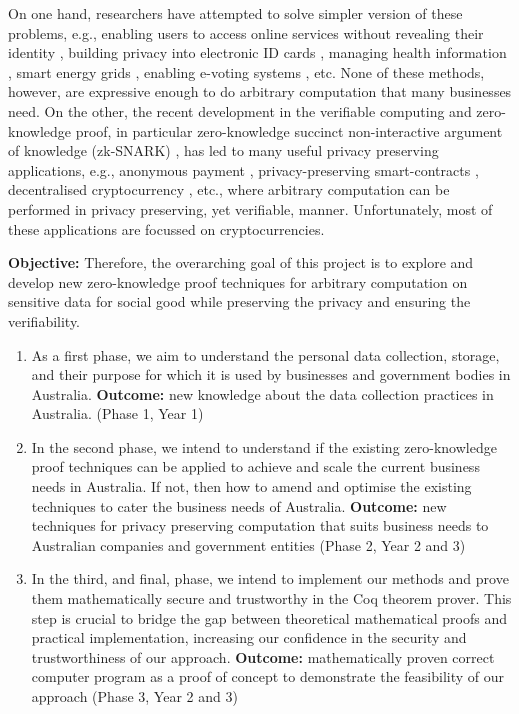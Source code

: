 \documentclass[12pt,a4paper]{article}
\begin{document}
On one hand, researchers have attempted to solve simpler version of 
these problems, e.g., 
enabling users to access online 
services without revealing their identity \cite{10.1145/586110.586114},
building privacy into electronic ID cards \cite{10.1145/2133375.2133379},
managing health information \cite{10.1145/3338854},
smart energy grids  \cite{LIN2021103505}, enabling e-voting systems \cite{doesburg2020using}, etc. 
None of these methods, however, are expressive enough to do arbitrary
computation that many businesses need. On the other, 
the recent development in the verifiable computing and zero-knowledge proof, 
in particular zero-knowledge succinct non-interactive argument of knowledge (zk-SNARK) 
\cite{10.1007/978-3-642-17373-8_19, 10.1007/978-3-642-38348-9_37, 
ben2013snarks, parno2016pinocchio, groth2016size, 10.1007/978-3-642-36594-2_18,
10.1007/978-3-662-44381-1_16, 8418611, 10.1007/978-3-030-17653-2_4, 10.1145/3319535.3339817,
cryptoeprint:2019/953, 10.1007/978-3-030-45721-1_26, 10.1007/978-3-030-56877-1_25}, 
has led to many useful privacy preserving applications, e.g., 
anonymous payment \cite{6956581}, privacy-preserving smart-contracts \cite{7546538},  
decentralised cryptocurrency \cite{cryptoeprint:2020/352}, etc., where 
arbitrary computation can be performed in privacy preserving, yet verifiable, manner. 
Unfortunately, most of these applications are focussed on cryptocurrencies. 

\textbf{Objective:} Therefore, the overarching goal of this
project is to explore and develop new zero-knowledge proof techniques for 
arbitrary computation on sensitive data for social good while preserving the privacy and ensuring the verifiability. 

\begin{enumerate}
  \item As a first phase, we aim to understand the personal data collection, storage, and their 
  purpose for which it is used by businesses and government bodies in Australia. 
  \textbf{Outcome:} new knowledge about the data collection practices in Australia. 
  (Phase 1, Year 1)
  \item In the second phase, we intend to understand if the existing zero-knowledge proof techniques 
  can be applied to achieve and scale the current business needs in Australia. If not, 
  then how to amend and optimise the existing techniques to cater the business needs of Australia.
  \textbf{Outcome:} new techniques for privacy preserving computation that suits business needs to Australian 
  companies and government entities (Phase 2, Year 2 and 3) 
  \item In the third, and final, phase, we intend to implement our methods 
  and prove them mathematically secure and trustworthy in the Coq theorem prover. 
  This step is crucial to bridge the gap between theoretical mathematical proofs and 
  practical implementation, increasing our confidence in the security and trustworthiness 
  of our approach. \textbf{Outcome:} mathematically proven correct computer program 
  as a proof of concept to demonstrate the feasibility of our approach
  (Phase 3, Year 2 and 3)
\end{enumerate}
\end{document}
